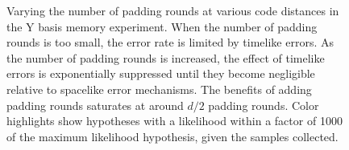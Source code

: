 \documentclass[onecolumn,unpublished,a4paper]{quantumarticle}
\theoremstyle{definition}
\theoremstyle{definition}
\theoremstyle{definition}
\begin{document}
\begin{figure}[H]
    \centering
    \caption{
        Varying the number of padding rounds at various code distances in the Y basis memory experiment.
        When the number of padding rounds is too small, the error rate is limited by timelike errors.
        As the number of padding rounds is increased, the effect of timelike errors is exponentially suppressed until they become negligible relative to spacelike error mechanisms.
        The benefits of adding padding rounds saturates at around $d/2$ padding rounds.
        Color highlights show hypotheses with a likelihood within a factor of 1000 of the maximum likelihood hypothesis, given the samples collected.
    }
    \label{fig:pad_saturation}
\end{figure}
\end{document}
